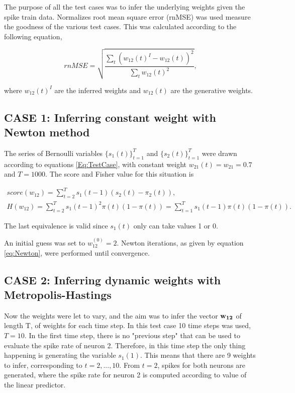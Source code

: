 The purpose of all the test cases was to infer the underlying weights given the spike train data. Normalizes root mean square error (rnMSE) was used measure the goodness of the various test cases. This was calculated according to the following equation,

\begin{equation}
    rnMSE = \sqrt{\frac{\sum_t(w_{12}(t)^I-w_{12}(t))^2}{\sum_t w_{12}(t)^2}},
\end{equation}

where $w_{12}(t)^I$  are the inferred weights and $w_{12}(t)$ are the generative weights.

\subsection{CASE 1: Inferring constant weight with Newton method}
\label{sec:CASE1}

The series of Bernoulli variables $\{s_{1}(t)\}_{t=1}^T$ and $\{s_{2}(t)\}_{t=1}^T$ were drawn according to equations \ref{Eq:TestCase}, with constant weight $w_{21}(t) = w_{21} = 0.7$ and $T=1000$. The score and Fisher value for this situation is 

\begin{equation}
\begin{split}
    score(w_{12}) = \sum_{t=2}^{T} s_{1}(t-1) (s_{2}(t)-\pi_{2}(t)), \\
    H(w_{12}) = \sum_{t=2}^T s_{1}(t-1)^2 \pi(t)(1-\pi(t)) = \sum_{t=1}^T s_{1}(t-1) \pi(t)(1-\pi(t)).
\end{split}
\end{equation}

The last equivalence is valid since $s_{1}(t)$ only can take values 1 or 0. 

An initial guess was set to $w_{12}^{(0)} = 2$. Newton iterations, as given by equation \ref{eq:Newton}, were performed until convergence.\\ 

\subsection{CASE 2: Inferring dynamic weights with Metropolis-Hastings}
\label{sec:CASE2}
Now the weights were let to vary, and the aim was to infer the vector ${\bf w_{12}}$ of length T, of weights for each time step. In this test case 10 time steps was used, $T=10$. In the first time step, there is no "previous step" that can be used to evaluate the spike rate of neuron 2. Therefore, in this time step the only thing happening is generating the variable $s_{1}(1)$. This means that there are 9 weights to infer, corresponding to $t=2,...,10$. From $t=2$, spikes for both neurons are generated, where the spike rate for neuron 2 is computed according to value of the linear predictor. 

